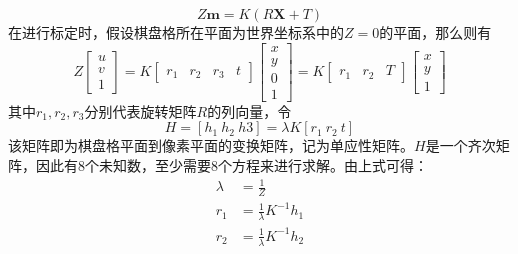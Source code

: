 \begin{equation}
    Z \bm{m} = K(R\bm{X} + T)
\end{equation}
在进行标定时，假设棋盘格所在平面为世界坐标系中的\(Z=0\)的平面，那么则有
\begin{equation}
Z\left[ \begin{array}{c} u \\ v \\ 1 \end{array} \right] = K\left[ 
    \begin{array}{cccc} r_1 & r_2 & r_3 & t\end{array}
    \right]
    \left[ 
    \begin{array}{c}x \\y \\0 \\1\end{array}
    \right]=K
    \left[ 
    \begin{array}{cccc} r_1 & r_2 & T\end{array}
    \right]
    \left[ 
    \begin{array}{c}x \\y \\1\end{array}
    \right]
\end{equation}
其中\(r_1,r_2,r_3\)分别代表旋转矩阵\(R\)的列向量，令
\begin{equation}
    H=[h_1\ h_2\ h3] = \lambda K[r_1\ r_2\ t]
\end{equation}
该矩阵即为棋盘格平面到像素平面的变换矩阵，记为单应性矩阵。\(H\)是一个齐次矩阵，因此有8个未知数，至少需要8个方程来进行求解。由上式可得：
\begin{align}
    \lambda &= \frac{1}{Z} \\
    r_1 &= \frac{1}{\lambda} K^{-1}h_1 \\
    r_2 &= \frac{1}{\lambda} K^{-1}h_2
\end{align}

